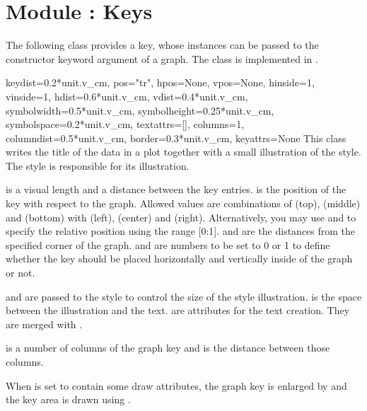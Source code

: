 
\section{Module : Keys} %
\label{graph:key}


The following class provides a key, whose instances can be passed to
the constructor keyword argument  of a graph. The class is
implemented in .

\begin{classdesc}{key}{dist=0.2*unit.v\_cm,
                       pos="tr", hpos=None, vpos=None,
                       hinside=1, vinside=1,
                       hdist=0.6*unit.v\_cm,
                       vdist=0.4*unit.v\_cm,
                       symbolwidth=0.5*unit.v\_cm,
                       symbolheight=0.25*unit.v\_cm,
                       symbolspace=0.2*unit.v\_cm,
                       textattrs=[],
                       columns=1, columndist=0.5*unit.v\_cm,
                       border=0.3*unit.v\_cm, keyattrs=None}
  This class writes the title of the data in a plot together with a
  small illustration of the style. The style is responsible for its
  illustration.

   is a visual length and a distance between the key
  entries.  is the position of the key with respect to the
  graph. Allowed values are combinations of  (top),
   (middle) and  (bottom) with  (left),
   (center) and  (right). Alternatively, you may
  use  and  to specify the relative position
  using the range [0:1].  and  are the distances
  from the specified corner of the graph.  and
   are numbers to be set to 0 or 1 to define whether the
  key should be placed horizontally and vertically inside of the graph
  or not.

   and  are passed to the style to
  control the size of the style illustration.  is the
  space between the illustration and the text.  are
  attributes for the text creation. They are merged with
  .

   is a number of columns of the graph key and
   is the distance between those columns.

  When  is set to contain some draw attributes, the
  graph key is enlarged by  and the key area is drawn
  using .
\end{classdesc} %

